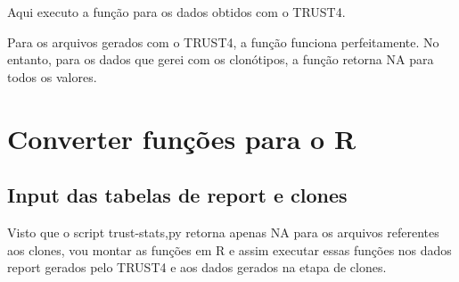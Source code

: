 \documentclass[
  letterpaper,
  DIV=11,
  numbers=noendperiod]{scrartcl}
\newenvironment{Shaded}{\begin{snugshade}}{\end{snugshade}}
\newcommand{\AttributeTok}[1]{\textcolor[rgb]{0.40,0.45,0.13}{#1}}
\newcommand{\BuiltInTok}[1]{\textcolor[rgb]{0.00,0.23,0.31}{#1}}
\newcommand{\ControlFlowTok}[1]{\textcolor[rgb]{0.00,0.23,0.31}{#1}}
\newcommand{\ExtensionTok}[1]{\textcolor[rgb]{0.00,0.23,0.31}{#1}}
\newcommand{\NormalTok}[1]{\textcolor[rgb]{0.00,0.23,0.31}{#1}}
\newcommand{\OperatorTok}[1]{\textcolor[rgb]{0.37,0.37,0.37}{#1}}
\newcommand{\StringTok}[1]{\textcolor[rgb]{0.13,0.47,0.30}{#1}}
\newcommand{\VariableTok}[1]{\textcolor[rgb]{0.07,0.07,0.07}{#1}}
\begin{document}
Aqui executo a função para os dados obtidos com o TRUST4.

\begin{Shaded}
\end{Shaded}

Para os arquivos gerados com o TRUST4, a função funciona perfeitamente.
No entanto, para os dados que gerei com os clonótipos, a função retorna
NA para todos os valores.

\begin{Shaded}
\end{Shaded}

\hypertarget{converter-funuxe7uxf5es-para-o-r}{%
\section{Converter funções para o
R}\label{converter-funuxe7uxf5es-para-o-r}}

\hypertarget{input-das-tabelas-de-report-e-clones}{%
\subsection{Input das tabelas de report e
clones}\label{input-das-tabelas-de-report-e-clones}}

Visto que o script trust-stats,py retorna apenas NA para os arquivos
referentes aos clones, vou montar as funções em R e assim executar essas
funções nos dados report gerados pelo TRUST4 e aos dados gerados na
etapa de clones.
\end{document}
